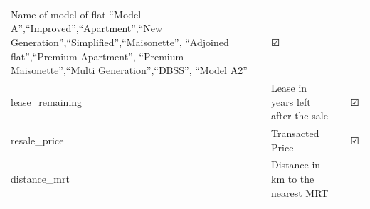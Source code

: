 \documentclass[]{book}
\begin{document}
\begin{longtable}[]{@{}llll@{}}
\begin{minipage}[t]{0.70\columnwidth}
Name of model of flat ``Model A'',``Improved'',``Apartment'',``New
Generation'',``Simplified'',``Maisonette'', ``Adjoined flat'',``Premium
Apartment'', ``Premium Maisonette'',``Multi Generation'',``DBSS'',
``Model A2''\strut
\end{minipage} & \begin{minipage}[t]{0.04\columnwidth}\raggedright\strut
☑\strut
\end{minipage} & \begin{minipage}[t]{0.05\columnwidth}\raggedright\strut
\strut
\end{minipage}\tabularnewline
\begin{minipage}[t]{0.09\columnwidth}\raggedright\strut
lease\_remaining\strut
\end{minipage} & \begin{minipage}[t]{0.70\columnwidth}\raggedright\strut
Lease in years left after the sale\strut
\end{minipage} & \begin{minipage}[t]{0.04\columnwidth}\raggedright\strut
\strut
\end{minipage} & \begin{minipage}[t]{0.05\columnwidth}\raggedright\strut
☑\strut
\end{minipage}\tabularnewline
\begin{minipage}[t]{0.09\columnwidth}\raggedright\strut
resale\_price\strut
\end{minipage} & \begin{minipage}[t]{0.70\columnwidth}\raggedright\strut
Transacted Price\strut
\end{minipage} & \begin{minipage}[t]{0.04\columnwidth}\raggedright\strut
\strut
\end{minipage} & \begin{minipage}[t]{0.05\columnwidth}\raggedright\strut
☑\strut
\end{minipage}\tabularnewline
\begin{minipage}[t]{0.09\columnwidth}\raggedright\strut
distance\_mrt\strut
\end{minipage} & \begin{minipage}[t]{0.70\columnwidth}\raggedright\strut
Distance in km to the nearest MRT\strut
\end{minipage} & \begin{minipage}[t]{0.04\columnwidth}\raggedright\strut
\strut
\end{minipage} & \begin{minipage}[t]{0.05\columnwidth}\raggedright\strut

\end{minipage}
\end{longtable}
\end{document}
